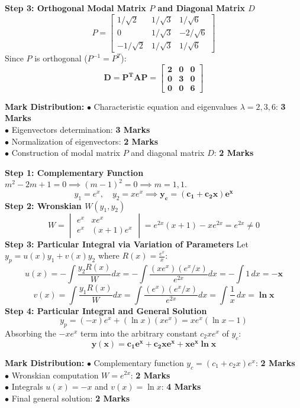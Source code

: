 \begin{solutionbox}
\textbf{Step 3: Orthogonal Modal Matrix $P$ and Diagonal Matrix $D$}
\[
P = \begin{bmatrix}
1/\sqrt{2} & 1/\sqrt{3} & 1/\sqrt{6} \\
0 & 1/\sqrt{3} & -2/\sqrt{6} \\
-1/\sqrt{2} & 1/\sqrt{3} & 1/\sqrt{6}
\end{bmatrix}
\]
Since $P$ is orthogonal ($P^{-1} = P^T$):
\[
\mathbf{D = P^T A P = \begin{bmatrix} 2 & 0 & 0 \\ 0 & 3 & 0 \\ 0 & 0 & 6 \end{bmatrix}}
\]

\begin{markingrubric}
\textbf{Mark Distribution:}
$\bullet$ Characteristic equation and eigenvalues $\lambda = 2, 3, 6$: \textbf{3 Marks}\\
$\bullet$ Eigenvectors determination: \textbf{3 Marks}\\
$\bullet$ Normalization of eigenvectors: \textbf{2 Marks}\\
$\bullet$ Construction of modal matrix $P$ and diagonal matrix $D$: \textbf{2 Marks}
\end{markingrubric}
\end{solutionbox}

\begin{solutionbox}
\textbf{Step 1: Complementary Function}
$m^2 - 2m + 1 = 0 \implies (m - 1)^2 = 0 \implies m = 1, 1$.
\[
y_1 = e^x, \quad y_2 = x e^x \implies \mathbf{y_c = (c_1 + c_2 x)e^x}
\]
\textbf{Step 2: Wronskian $W(y_1, y_2)$}
\[
W = \begin{vmatrix} e^x & x e^x \\ e^x & (x+1)e^x \end{vmatrix} = e^{2x}(x+1) - x e^{2x} = e^{2x} \neq 0
\]
\textbf{Step 3: Particular Integral via Variation of Parameters}
Let $y_p = u(x)y_1 + v(x)y_2$ where $R(x) = \frac{e^x}{x}$:
\[
u(x) = -\int \frac{y_2 R(x)}{W} dx = -\int \frac{(x e^x)(e^x / x)}{e^{2x}} dx = -\int 1 \, dx = \mathbf{-x}
\]
\[
v(x) = \int \frac{y_1 R(x)}{W} dx = \int \frac{(e^x)(e^x / x)}{e^{2x}} dx = \int \frac{1}{x} \, dx = \mathbf{\ln x}
\]
\textbf{Step 4: Particular Integral and General Solution}
\[
y_p = (-x)e^x + (\ln x)(x e^x) = x e^x (\ln x - 1)
\]
Absorbing the $-x e^x$ term into the arbitrary constant $c_2 x e^x$ of $y_c$:
\[
\mathbf{y(x) = c_1 e^x + c_2 x e^x + x e^x \ln x}
\]

\begin{markingrubric}
\textbf{Mark Distribution:}
$\bullet$ Complementary function $y_c = (c_1 + c_2 x)e^x$: \textbf{2 Marks}\\
$\bullet$ Wronskian computation $W = e^{2x}$: \textbf{2 Marks}\\
$\bullet$ Integrals $u(x) = -x$ and $v(x) = \ln x$: \textbf{4 Marks}\\
$\bullet$ Final general solution: \textbf{2 Marks}
\end{markingrubric}
\end{solutionbox}

